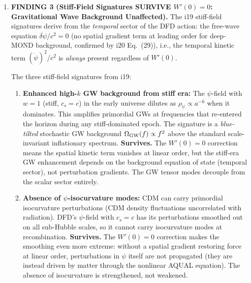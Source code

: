 \documentclass[11pt]{article}
\begin{document}
\begin{tcolorbox}[colback=blue!5!white, colframe=blue!70!black,
  title=\textbf{TOP 5 FINDINGS (Ranked by Impact on DFD Programme)}]
\begin{enumerate}
  \textbf{Grade: C (Conjecture).}  Qualitative prediction is robust;
  quantitative amplitude requires numerical computation.

\item \textbf{FINDING 3 (Stiff-Field Signatures SURVIVE $W'(0)=0$:
  Gravitational Wave Background Unaffected).}
  The i19 stiff-field signatures derive from the \emph{temporal}
  sector of the DFD action: the free-wave equation
  $\ddot{\delta\psi}/c^2 = 0$ (no spatial gradient term at leading
  order for deep-MOND background, confirmed by i20 Eq.~(29)),
  i.e., the temporal kinetic term $(\dot{\psi})^2/c^2$ is
  \emph{always} present regardless of $W'(0)$.

  The three stiff-field signatures from i19:
  \begin{enumerate}
  \item[(a)] \textbf{Enhanced high-$k$ GW background from stiff era:}
    The $\psi$-field with $w = 1$ (stiff, $c_s = c$) in the early
    universe dilutes as $\rho_\psi \propto a^{-6}$ when it dominates.
    This amplifies primordial GWs at frequencies that re-entered the
    horizon during any stiff-dominated epoch.  The signature is a
    \emph{blue-tilted} stochastic GW background $\Omega_{\rm GW}(f)
    \propto f^2$ above the standard scale-invariant inflationary spectrum.
    \textbf{Survives.}  The $W'(0) = 0$ correction means the spatial
    kinetic term vanishes at linear order, but the stiff-era GW
    enhancement depends on the background equation of state (temporal
    sector), not perturbation gradients.  The GW tensor modes decouple
    from the scalar sector entirely.

  \item[(b)] \textbf{Absence of $\psi$-isocurvature modes:}
    CDM can carry primordial isocurvature perturbations (CDM density
    fluctuations uncorrelated with radiation).  DFD's $\psi$-field
    with $c_s = c$ has its perturbations smoothed out on all sub-Hubble
    scales, so it cannot carry isocurvature modes at recombination.
    \textbf{Survives.}  The $W'(0) = 0$ correction makes the smoothing
    even more extreme: without a spatial gradient restoring force at
    linear order, perturbations in $\psi$ itself are not propagated
    (they are instead driven by matter through the nonlinear AQUAL
    equation).  The absence of isocurvature is strengthened, not weakened.


\end{enumerate}
\end{enumerate}
\end{tcolorbox}
\end{document}
